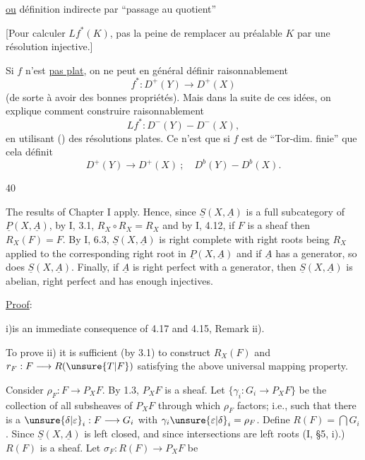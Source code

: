 \uline{ou} définition indirecte par ``passage au quotient''

[Pour calculer $Lf^*(K)$, pas la peine de remplacer au préalable $K$
par une résolution injective.]

 Si $f$ n'est \uline{pas plat}, on  ne peut
en général définir raisonnablement
\[
f^*:D^+(Y)\longrightarrow D^+(X)
\]
(de sorte à avoir des bonnes propriétés).
Mais dans la suite de ces idées, on explique comment construire raisonnablement
\[
Lf^*:D^-(Y)\mathbin{-}D^-(X),
\]
en utilisant () des résolutions plates.
Ce n'est que si $f$ est de ``Tor-dim. finie'' que cela définit
\[
D^+(Y)\longrightarrow D^+(X)\ ;\quad D^b(Y)\mathbin{-}D^b(X).
\]

\hfill 40

The results of Chapter I apply. Hence, since $\underline S(X,\underline A)$ is
a full subcategory of $\underline P(X,\underline A)$, by I, 3.1,
$R_X\circ R_X=R_X$ and by I, 4.12, if $F$ is a sheaf then $R_X(F)=F$.
By I, 6.3, $\underline S(X,\underline A)$ is right complete with right roots
being $R_X$ applied to the corresponding right root in
$\underline P(X,\underline A)$ and if $\underline A$ has a generator,
so does $\underline S(X,\underline A)$. Finally, if $\underline A$ is
right perfect with a generator, then $\underline S(X,\underline A)$ is
abelian, right perfect and has enough injectives.

\uline{Proof}:

i)\quad is an immediate consequence of 4.17 and 4.15, Remark ii).

To prove ii) it is sufficient (by 3.1) to construct $R_X(F)$ and
$r_F:F\longrightarrow R(\unsure{T|F})$ satisfying the above universal mapping property.

Consider $\rho_F:F\longrightarrow P_XF$. By 1.3, $P_XF$ is a sheaf.
Let $\{\gamma_i:G_i\longrightarrow P_XF\}$ be the collection of all subsheaves
of $P_XF$ through which $\rho_F$ factors; i.e., such that there is a
$\unsure{\delta|\varepsilon}_i:F\longrightarrow G_i$ with
$\gamma_i\unsure{\varepsilon|\delta}_i=\rho_F$.
Define $R(F)=\bigcap G_i$.
Since $\underline S(X,\underline A)$ is left closed, and since intersections
are left roots (I, \S 5, i).) $R(F)$ is a sheaf.
Let $\sigma_F:R(F)\longrightarrow P_XF$ be

